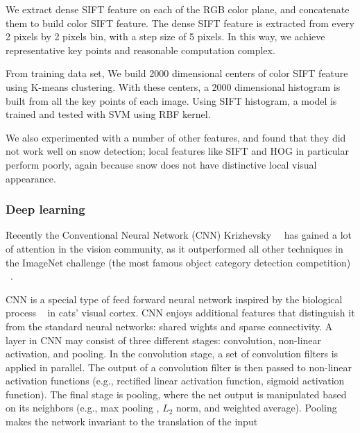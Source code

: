 We extract dense SIFT feature on each of the RGB color plane, and concatenate them to build color SIFT feature. The dense SIFT feature is extracted from every 2 pixels by 2 pixels bin, with a step size of 5 pixels. In this way, we achieve representative key points and reasonable computation complex. 

From training data set, We build 2000 dimensional centers of color SIFT feature using K-means clustering. With these centers, a 2000 dimensional histogram is built from all the key points of each image.
Using SIFT histogram, a model is trained and tested with SVM using RBF kernel. 


We also experimented with a number of other features, and found that they did not work well on snow detection; local features like SIFT and HOG in particular perform poorly, again because snow does not have distinctive local visual appearance. 







\subsubsection{Deep learning}
Recently the Conventional Neural Network (CNN) Krizhevsky~\etal~\cite{krizhevsky2012imagenet} has gained a lot of attention in the vision community, as it outperformed all other techniques in the ImageNet challenge (the most famous object category detection competition) ~\cite{russakovsky2014imagenet}.



CNN is a special type of feed forward neural network inspired by the biological process ~\cite{krizhevsky2012imagenet} in cats' visual cortex. 
CNN enjoys additional features that distinguish it from the standard neural networks: shared wights and sparse connectivity.
A layer in CNN may consist of three different stages: convolution, non-linear activation, and pooling.
In the convolution stage, a set of convolution filters is applied in parallel. 
The output of a convolution filter is then passed to non-linear activation functions (e.g., rectified linear activation function, sigmoid activation function).
The final stage is pooling, where the net output is manipulated based on its neighbors (e.g., max pooling , $L_2$ norm, and weighted average).
Pooling makes the network invariant to the translation of the input

